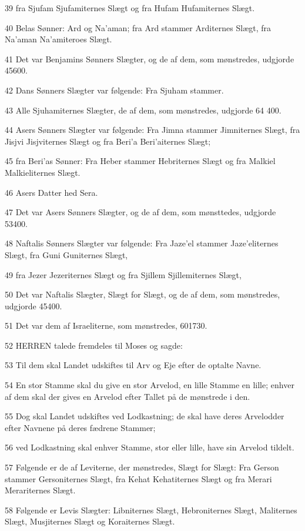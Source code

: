\par 39 fra Sjufam Sjufamiternes Slægt og fra Hufam Hufamiternes Slægt.
\par 40 Belas Sønner: Ard og Na'aman; fra Ard stammer Arditernes Slægt, fra Na'aman Na'amiteroes Slægt.
\par 41 Det var Benjamins Sønners Slægter, og de af dem, som mønstredes, udgjorde 45600.
\par 42 Dans Sønners Slægter var følgende: Fra Sjuham stammer.
\par 43 Alle Sjuhamiternes Slægter, de af dem, som mønstredes, udgjorde 64 400.
\par 44 Asers Sønners Slægter var følgende: Fra Jimna stammer Jimniternes Slægt, fra Jisjvi Jisjviternes Slægt og fra Beri'a Beri'aiternes Slægt;
\par 45 fra Beri'as Sønner: Fra Heber stammer Hebriternes Slægt og fra Malkiel Malkieliternes Slægt.
\par 46 Asers Datter hed Sera.
\par 47 Det var Asers Sønners Slægter, og de af dem, som mønsttedes, udgjorde 53400.
\par 48 Naftalis Sønners Slægter var følgende: Fra Jaze'el stammer Jaze'eliternes Slægt, fra Guni Guniternes Slægt,
\par 49 fra Jezer Jezeriternes Slægt og fra Sjillem Sjillemiternes Slægt,
\par 50 Det var Naftalis Slægter, Slægt for Slægt, og de af dem, som mønstredes, udgjorde 45400.
\par 51 Det var dem af Israeliterne, som mønstredes, 601730.
\par 52 HERREN talede fremdeles til Moses og sagde:
\par 53 Til dem skal Landet udskiftes til Arv og Eje efter de optalte Navne.
\par 54 En stor Stamme skal du give en stor Arvelod, en lille Stamme en lille; enhver af dem skal der gives en Arvelod efter Tallet på de mønstrede i den.
\par 55 Dog skal Landet udskiftes ved Lodkastning; de skal have deres Arvelodder efter Navnene på deres fædrene Stammer;
\par 56 ved Lodkastning skal enhver Stamme, stor eller lille, have sin Arvelod tildelt.
\par 57 Følgende er de af Leviterne, der mønstredes, Slægt for Slægt: Fra Gerson stammer Gersoniternes Slægt, fra Kehat Kehatiternes Slægt og fra Merari Merariternes Slægt.
\par 58 Følgende er Levis Slægter: Libniternes Slægt, Hebroniternes Slægt, Maliternes Slægt, Musjiternes Slægt og Koraiternes Slægt.
